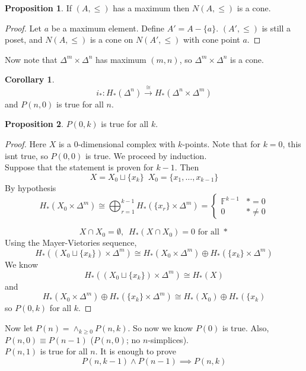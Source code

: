 \documentclass[a4paper,14pt]{extarticle}
\theoremstyle{definition}
\newtheorem*{corollary}{Corollary}
\newtheorem*{proposition}{Proposition}
\begin{document}
\begin{proposition}
	If $(A,\leq)$ has a maximum then $N(A,\leq)$ is a cone.
\end{proposition}

\begin{proof}
	Let $a$ be a maximum element. Define $A'=A-\{a\}$. $(A',\leq)$ is still a poset, and 
	$N(A,\leq)$ is a cone on $N(A',\leq)$ with cone point $a$.
\end{proof}

Now note that $\Delta^m\times\Delta^n$ has maximum $(m,n)$, so $\Delta^m\times\Delta^n$ is a 
cone.

\begin{corollary}
	\[i_*:H_*(\Delta^n)\xrightarrow{\cong}H_*(\Delta^n\times\Delta^m)\]
	and $P(n,0)$ is true for all $n$.
\end{corollary}

\begin{proposition}
	$P(0,k)$ is true for all $k$.
\end{proposition}

\begin{proof}
	Here $X$ is a $0$-dimensional complex with $k$-points. Note that for $k=0$, this isnt
	true, so $P(0,0)$ is true. We proceed by induction. \\

	Suppose that the statement is proven for $k-1$. Then
	\[X=X_0\sqcup\{x_k\}\,\,\,X_0=\{x_1,\ldots,x_{k-1}\}\]
	By hypothesis 
	\[H_*(X_0\times\Delta^m)\cong\bigoplus_{r=1}^{k-1}H_*(\{x_r\}\times\Delta^m)=
	\begin{cases}
		\mathbb{F}^{k-1}&*=0\\0&*\neq0
	\end{cases}\]

	\[X\cap X_0=\emptyset, \,\,\,H_*(X\cap X_0)=0\text{ for all }*\]
	Using the Mayer-Vietories sequence,
	\[H_*((X_0\sqcup\{x_k\})\times\Delta^m)\cong H_*(X_0\times\Delta^m)\oplus H_*(\{x_k\}\times
	\Delta^m)\]
	We know \[H_*((X_0\sqcup\{x_k\})\times\Delta^m)\cong H_*(X)\] and 
	\[H_*(X_0\times\Delta^m)\oplus H_*(\{x_k\}\times
	\Delta^m)\cong H_*(X_0)\oplus H_*(\{x_k)\] so $P(0,k)$ for all $k$.
\end{proof}

Now let $P(n)=\wedge_{k\geq0} P(n,k)$. So now we know $P(0)$ is true. Also,
$P(n,0)\equiv P(n-1)$ ($P(n,0)$; no $n$-simplices). \\

$P(n,1)$ is true for all $n$. It is enough to prove 
\[P(n,k-1)\wedge P(n-1)\implies P(n,k)\]
\end{document}
